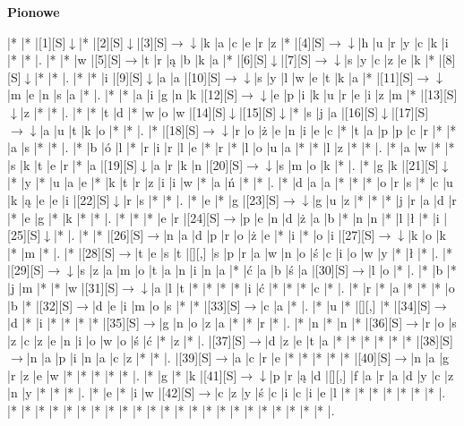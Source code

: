 \documentclass[11pt]{article}
\newcommand\drarr{$\rightarrow \!\!\!\!\! \downarrow$}
\newcommand\rarr{$\rightarrow$}
\newcommand\darr{$\downarrow$}
\begin{document}
\begin{PuzzleClues}{\textbf{Pionowe}\\}
\end{PuzzleClues}\newpage%

\noindent\begin{Puzzle}{22}{23}|*	|*	|[1][S]\darr	|*	|[2][S]\darr	|[3][S]\drarr	|k	|a	|c	|e	|r	|z	|*	|[4][S]\drarr	|h	|u	|r	|y	|c	|k	|i	|*	|*	|.
|*	|*	|w	|[5][S]\rarr	|t	|r	|ą	|b	|k	|a	|*	|[6][S]\darr	|[7][S]\drarr	|s	|y	|c	|z	|e	|k	|*	|[8][S]\darr	|*	|*	|.
|*	|*	|i	|[9][S]\darr	|a	|a	|[10][S]\drarr	|s	|y	|l	|w	|e	|t	|k	|a	|*	|[11][S]\drarr	|m	|e	|n	|s	|a	|*	|.
|*	|*	|a	|i	|g	|n	|k	|[12][S]\drarr	|e	|p	|i	|k	|u	|r	|e	|i	|z	|m	|*	|[13][S]\darr	|z	|*	|*	|.
|*	|*	|t	|d	|*	|w	|o	|w	|[14][S]\darr	|[15][S]\darr	|*	|s	|j	|a	|[16][S]\darr	|[17][S]\drarr	|a	|u	|t	|k	|o	|*	|*	|.
|*	|[18][S]\drarr	|r	|o	|ż	|e	|n	|i	|e	|c	|*	|t	|a	|p	|p	|c	|r	|*	|*	|a	|s	|*	|*	|.
|*	|b	|ó	|l	|*	|r	|i	|r	|l	|e	|*	|r	|*	|l	|o	|u	|a	|*	|*	|l	|z	|*	|*	|.
|*	|a	|w	|*	|*	|s	|k	|t	|e	|r	|*	|a	|[19][S]\darr	|a	|r	|k	|n	|[20][S]\drarr	|s	|m	|o	|k	|*	|.
|*	|g	|k	|[21][S]\darr	|*	|y	|*	|u	|a	|e	|*	|k	|t	|r	|z	|i	|i	|w	|*	|a	|ń	|*	|*	|.
|*	|d	|a	|a	|*	|*	|*	|o	|r	|s	|*	|c	|u	|k	|ą	|e	|e	|i	|[22][S]\darr	|r	|s	|*	|*	|.
|*	|e	|*	|g	|[23][S]\drarr	|g	|u	|z	|*	|*	|*	|j	|r	|a	|d	|r	|*	|e	|g	|*	|k	|*	|*	|.
|*	|*	|*	|e	|r	|[24][S]\rarr	|p	|e	|n	|d	|ż	|a	|b	|*	|n	|n	|*	|l	|ł	|*	|i	|[25][S]\darr	|*	|.
|*	|*	|[26][S]\rarr	|n	|a	|d	|p	|r	|o	|ż	|e	|*	|i	|*	|o	|i	|[27][S]\drarr	|k	|o	|k	|*	|m	|*	|.
|*	|[28][S]\rarr	|t	|e	|s	|t	|[][,]{ }	|s	|p	|r	|a	|w	|n	|o	|ś	|c	|i	|o	|w	|y	|*	|ł	|*	|.
|*	|[29][S]\drarr	|s	|z	|a	|m	|o	|t	|a	|n	|i	|n	|a	|*	|ć	|a	|b	|ś	|a	|[30][S]\rarr	|l	|o	|*	|.
|*	|b	|*	|j	|m	|*	|*	|w	|[31][S]\drarr	|a	|l	|t	|*	|*	|*	|*	|i	|ć	|*	|*	|*	|c	|*	|.
|*	|r	|*	|a	|*	|*	|*	|o	|b	|*	|[32][S]\rarr	|d	|e	|i	|m	|o	|s	|*	|*	|[33][S]\rarr	|c	|a	|*	|.
|*	|u	|*	|[][,]{ }	|*	|[34][S]\rarr	|d	|*	|i	|*	|*	|*	|*	|[35][S]\rarr	|g	|n	|o	|z	|a	|*	|*	|r	|*	|.
|*	|n	|*	|n	|*	|[36][S]\rarr	|r	|o	|s	|z	|c	|z	|e	|n	|i	|o	|w	|o	|ś	|ć	|*	|z	|*	|.
|[37][S]\rarr	|d	|z	|e	|t	|a	|*	|*	|*	|*	|*	|*	|[38][S]\rarr	|n	|a	|p	|i	|n	|a	|c	|z	|*	|*	|.
|[39][S]\rarr	|a	|c	|r	|e	|*	|*	|*	|*	|*	|[40][S]\rarr	|n	|a	|g	|r	|z	|e	|w	|*	|*	|*	|*	|*	|.
|*	|g	|*	|k	|[41][S]\drarr	|p	|r	|ą	|d	|[][,]{ }	|f	|a	|r	|a	|d	|y	|c	|z	|n	|y	|*	|*	|*	|.
|*	|e	|*	|i	|w	|[42][S]\rarr	|c	|z	|y	|ś	|c	|i	|c	|i	|e	|l	|*	|*	|*	|*	|*	|*	|*	|.
|*	|*	|*	|*	|*	|*	|*	|*	|*	|*	|*	|*	|*	|*	|*	|*	|*	|*	|*	|*	|*	|*	|*	|.\end{Puzzle}
\end{document}

